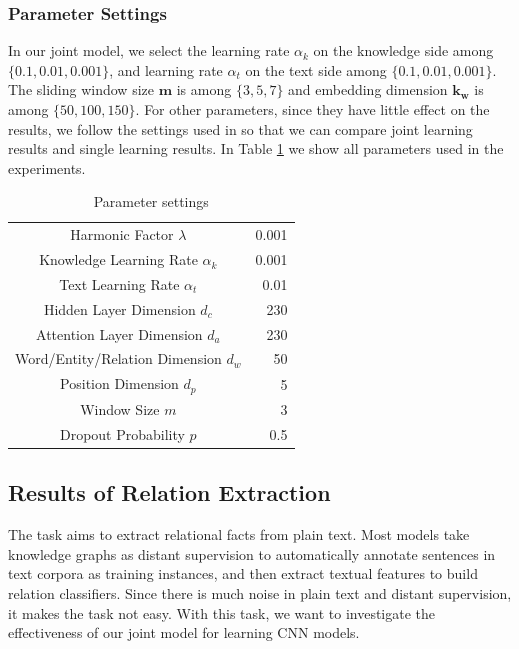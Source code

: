 \documentclass[11pt,a4paper]{article}
\begin{document}
\subsubsection{Parameter Settings}

In our joint model, we select the learning rate $\alpha_k$ on the knowledge side among $\{0.1, 0.01, 0.001\}$, and learning rate $\alpha_t$ on the text side among $\{0.1, 0.01, 0.001\}$. The sliding window size $\mathbf{m}$ is among $\{3,5,7\}$ and embedding dimension $\mathbf{k_w}$ is among $\{50, 100, 150\}$. For other parameters, since they have little effect on the results, we follow the settings used in \cite{zeng2014relation,lin2016neural} so that we can compare joint learning results and single learning results. In Table \ref{parameters} we show all parameters used in the experiments.


\begin{table}[t]
\centering
\caption{Parameter settings}
\label{my-label}
\begin{tabular}{|cr|}
\hline
\multicolumn{1}{|c|}{Harmonic Factor $\lambda$}                & 0.001 \\
\multicolumn{1}{|c|}{Knowledge Learning Rate $\alpha_k$}        & 0.001 \\
\multicolumn{1}{|c|}{Text Learning Rate $\alpha_t$}             & 0.01  \\
\multicolumn{1}{|c|}{Hidden Layer Dimension $d_c$}        & 230   \\
\multicolumn{1}{|c|}{Attention Layer Dimension $d_a$}     & 230   \\
\multicolumn{1}{|c|}{Word/Entity/Relation Dimension $d_w$} & 50    \\
\multicolumn{1}{|c|}{Position Dimension $d_p$}            & 5     \\
\multicolumn{1}{|c|}{Window Size $m$}    & 3     \\
\multicolumn{1}{|c|}{Dropout Probability $p$}            & 0.5  \\
\hline
\end{tabular}
\label{parameters}
\end{table}


\subsection{Results of Relation Extraction}

The task aims to extract relational facts from plain text. Most models \cite{mintz2009distant,riedel2010modeling,hoffmann2011knowledge,surdeanu2012multi,zeng2014relation,zeng2015distant,lin2016neural} take knowledge graphs as distant supervision to automatically annotate sentences in text corpora as training instances, and then extract textual features to build relation classifiers. Since there is much noise in plain text and distant supervision, it makes the task not easy. With this task, we want to investigate the effectiveness of our joint model for learning CNN models.
\end{document}
